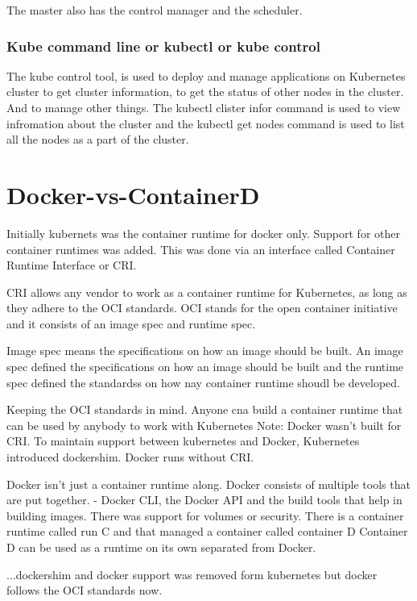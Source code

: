 \documentclass[11pt]{book}
\begin{document}
    The master also has the control manager and the scheduler.

    \subsubsection{Kube command line or kubectl or kube control}
    The kube control tool, is used to deploy and manage applications on Kubernetes cluster to get cluster information, to get the status of other nodes in the cluster. And to manage other things.
    The kubectl clister infor command is used to view infromation about the cluster and the kubectl get nodes command is used to list all the nodes as a part of the cluster.


    \section{Docker-vs-ContainerD}
    Initially kubernets was the container runtime for docker only. Support for other container runtimes was added.
    This was done via an interface called Container Runtime Interface or CRI.

    CRI allows any vendor to work as a container runtime for Kubernetes, as long as they adhere to the OCI standards.
    OCI stands for the open container initiative and it consists of an image spec and runtime spec.

    Image spec means the specifications on how an image should be built.
    An image spec defined the specifications on how an image should be built and the runtime spec defined the standardss on how nay container runtime shoudl be developed.

    Keeping the OCI standards in mind. Anyone cna build a container runtime that can be used by anybody to work with Kubernetes
    Note: Docker wasn't built for CRI. To maintain support between kubernetes and Docker, Kubernetes introduced dockershim.
    Docker runs without CRI.

    Docker isn't just a container runtime along. Docker consists of multiple tools that are put together.
    - Docker CLI, the Docker API and the build tools that help in building images.
    There was support for volumes or security. There is a container runtime called run C and that managed a container called container D
    Container D can be used as a runtime on its own separated from Docker.

    ...dockershim and docker support was removed form kubernetes but docker follows the OCI standards now.
\end{document}
